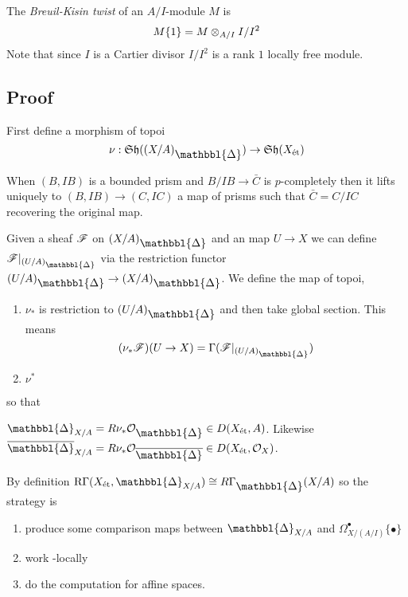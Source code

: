 \documentclass[12pt]{article}
\newcommand{\Prism}{{\mathlarger{\mathbbl{\Delta}}}}
\begin{document}
\begin{defn}
The \textit{Breuil-Kisin twist} of an $A / I$-module $M$ is 
\[ M \{ 1 \} = M \otimes_{A/I} I / I^2 \]
Note that since $I$ is a Cartier divisor $I / I^2$ is a rank $1$ locally free module. 
\end{defn}

\subsection{Proof}

First define a morphism of topoi
\[ \nu : \Sh((X/A)_{\Prism}) \to \Sh(X_{\et}) \]

\begin{lemma}[BS, 2.18]
When $(B, IB)$ is a bounded prism and $B/IB \to \bar{C}$ is $p$-completely \etale then it lifts uniquely to $(B, IB) \to (C, IC)$ a map of prisms such that $\bar{C} = C/IC$ recovering the original map.
\end{lemma}

Given a sheaf $\mathscr{F}$ on $(X/A)_{\Prism}$ and an \etale map $U \to X$ we can define $\F|_{(U/A)_{\Prism}}$ via the restriction functor $(U/A)_{\Prism} \to (X/A)_{\Prism}$. We define the map of topoi,
\begin{enumerate}
\item $\nu_*$ is restriction to $(U/A)_{\Prism}$ and then take global section. This means
\[ (\nu_* \F)(U \to X) = \Gamma(\F|_{(U/A)_{\Prism}}) \]
\item $\nu^*$ 
\end{enumerate}


so that
\begin{center}
\end{center}

\begin{defn}
$\Prism_{X/A} = R \nu_* \struct{\Prism} \in D(X_{\et}, A)$. Likewise $\ol{\Prism}_{X/A} = R \nu_* \struct{\ol{\Prism}} \in D(X_{\et}, \struct{X})$. 
\end{defn}

By definition $\R \Gamma(X_{\et}, \Prism_{X/A}) \cong R \Gamma_{\Prism}(X/A)$ so the strategy is
\begin{enumerate}
\item produce some comparison maps between $\Prism_{X/A}$ and $\Omega^\bullet_{X/(A/I)} \{ \bullet \}$
\item work \etale-locally
\item do the computation for affine spaces.
\end{enumerate}
\end{document}
